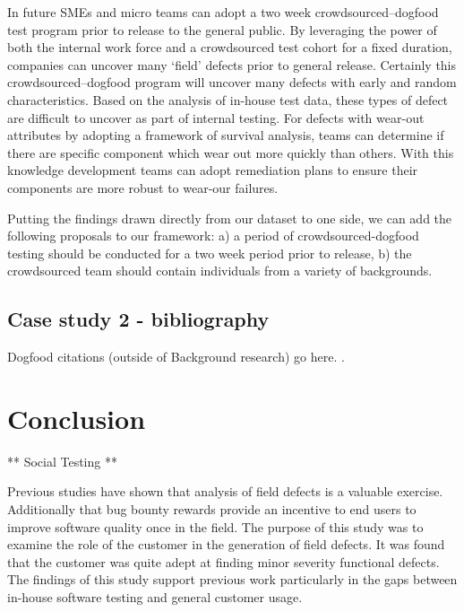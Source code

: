 In future SMEs and micro teams can adopt a two week crowdsourced--dogfood test program prior to release to the
general public. By leveraging the power of both the internal work force and a crowdsourced test cohort for a fixed duration, companies can uncover many `field' defects prior to general release. Certainly this crowdsourced--dogfood program will uncover many defects with early and random characteristics. Based on the analysis of in-house test data, these types of defect are difficult to uncover as part of internal testing. For defects with wear-out attributes by adopting a framework of survival analysis, teams can determine if there are specific component which wear out more quickly than others. With this knowledge development teams can adopt remediation plans to ensure their components are more robust to wear-our failures. \par

Putting the findings drawn directly from our dataset to one side, we can add the following proposals to our framework: a) a period of crowdsourced-dogfood testing should be conducted for a two week period prior to release, b) the crowdsourced team should contain individuals from a variety of backgrounds.

\subsection{Case study 2 - bibliography}
Dogfood citations (outside of Background research) go here. \cite{ref1}.



\section{Conclusion}

** Social Testing ** \par 

Previous studies have shown that analysis of field defects is a valuable exercise. Additionally that bug bounty rewards provide an incentive to end users to improve software quality once in the field. The purpose of this study was to examine the role of the customer in the generation of field defects. It was found that the customer was quite adept at finding minor severity functional defects.  The findings of this study support previous work particularly in the gaps between in-house software testing and general customer usage. \par

